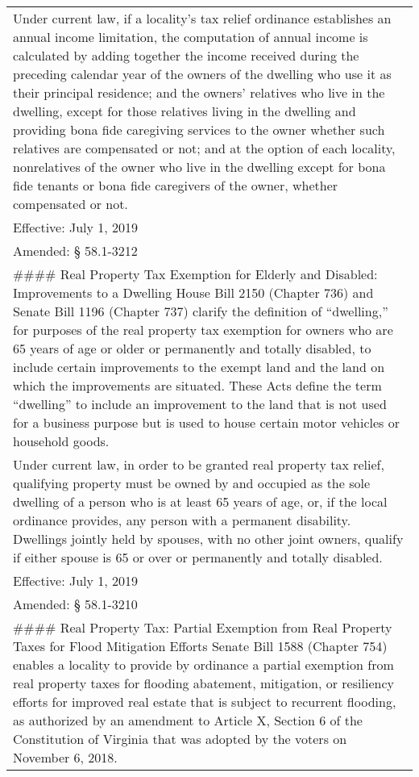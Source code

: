\documentclass[
]{book}
\begin{document}
\begin{longtable}[]{@{}
  >{\raggedright\arraybackslash}p{}@{}}
Under current law, if a locality's tax relief ordinance establishes an annual income limitation, the computation of annual income is calculated by adding together the income received during the preceding calendar year of the owners of the dwelling who use it as their principal residence; and the owners' relatives who live in the dwelling, except for those relatives living in the dwelling and providing bona fide caregiving services to the owner whether such relatives are compensated or not; and at the option of each locality, nonrelatives of the owner who live in the dwelling except for bona fide tenants or bona fide caregivers of the owner, whether compensated or not. \\
Effective: July 1, 2019 \\
Amended: § 58.1-3212 \\
\#\#\#\# Real Property Tax Exemption for Elderly and Disabled: Improvements to a Dwelling
House Bill 2150 (Chapter 736) and Senate Bill 1196 (Chapter 737) clarify the definition of ``dwelling,'' for purposes of the real property tax exemption for owners who are 65 years of age or older or permanently and totally disabled, to include certain improvements to the exempt land and the land on which the improvements are situated. These Acts define the term ``dwelling'' to include an improvement to the land that is not used for a business purpose but is used to house certain motor vehicles or household goods. \\
Under current law, in order to be granted real property tax relief, qualifying property must be owned by and occupied as the sole dwelling of a person who is at least 65 years of age, or, if the local ordinance provides, any person with a permanent disability. Dwellings jointly held by spouses, with no other joint owners, qualify if either spouse is 65 or over or permanently and totally disabled. \\
Effective: July 1, 2019 \\
Amended: § 58.1-3210 \\
\#\#\#\# Real Property Tax: Partial Exemption from Real Property Taxes for Flood Mitigation Efforts
Senate Bill 1588 (Chapter 754) enables a locality to provide by ordinance a partial exemption from real property taxes for flooding abatement, mitigation, or resiliency efforts for improved real estate that is subject to recurrent flooding, as authorized by an amendment to Article X, Section 6 of the Constitution of Virginia that was adopted by the voters on November 6, 2018. \\

\end{longtable}
\end{document}
